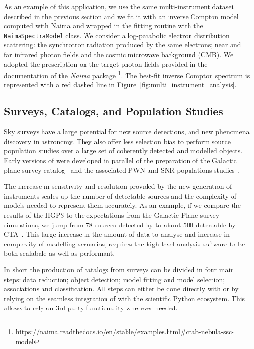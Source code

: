 \documentclass[traditabstract, longauth]{aa}
\newcommand{\code}[1]{\texttt{#1}}
\begin{document}
As an example of this application, we use the same multi-instrument
dataset described in the previous section and we fit it with an inverse
Compton model computed with Naima and wrapped in the \gammapy fitting
 routine with the \code{NaimaSpectraModel} class. We consider a log-parabolic
electron distribution scattering: the synchrotron radiation produced by
the same electrons; near and far infrared photon fields and the cosmic
microwave background (CMB). We adopted the prescription on the target
photon fields provided in the
documentation of the \textit{Naima} package \footnote{\url{https://naima.readthedocs.io/en/stable/examples.html\#crab-nebula-ssc-model}}.
The best-fit inverse Compton spectrum is represented with a red dashed line in
Figure~\ref{fig:multi_instrument_analysis}.

\subsection{Surveys, Catalogs, and Population Studies}
\label{ssec:surveys-catalogs-and-population-studies}

Sky surveys have a large potential for new source detections, and new phenomena
discovery in \gammaray astronomy. They also offer less selection bias to perform
source population studies over a large set of coherently detected and modelled objects.
Early versions of \gammapy were developed in parallel of the preparation of
the \hess Galactic plane survey catalog~\citep[HGPS, ][]{2018A&A...612A...1H} and
the associated PWN and SNR populations studies~\citep{2018A&A...612A...2H,
	2018A&A...612A...3H}. 

The increase in sensitivity and resolution provided by the new generation of
instruments scales up the number of detectable sources and the complexity of 
models needed to represent them accurately. As an example, if we compare the
results of the HGPS to the expectations from the \cta Galactic Plane survey
simulations, we jump from 78 sources detected by \hess to about 500 detectable by
CTA~\citep{2021arXiv210903729R}. This large increase in the amount of data to analyse
and increase in complexity of modelling scenarios, requires the high-level
analysis software to be both scalabale as well as performant. 

In short the production of catalogs from \gammaray surveys can be divided in
four main steps: data reduction; object detection; model fitting and model
selection; associations and classification. All steps can either be done directly
with \gammapy or by relying on the seamless integration
of \gammapy with the scientific Python ecosystem. This allows to rely
on 3rd party functionality wherever needed.
\end{document}
